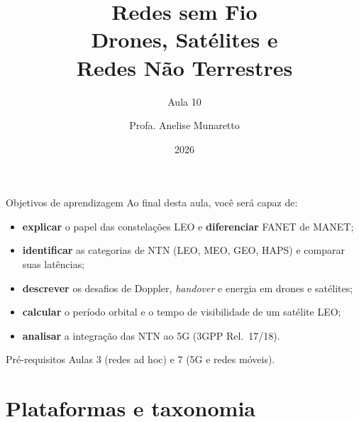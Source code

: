 \documentclass[aspectratio=169,11pt]{beamer}
\title[Redes sem Fio]{Redes sem Fio\\ Drones, Satélites e\\ Redes Não Terrestres}
\subtitle{Aula 10}
\author[Anelise Munaretto]{Profa. Anelise Munaretto}
\institute[Curso]{Redes sem Fio --- Ciência da Computação}
\date{2026}
\begin{document}
\begin{frame}[plain]
  \titlepage
\end{frame}

\begin{frame}{Objetivos de aprendizagem}
  Ao final desta aula, você será capaz de:
  \begin{itemize}
    \item \textbf{explicar} o papel das constelações LEO e \textbf{diferenciar} FANET de MANET;
    \item \textbf{identificar} as categorias de NTN (LEO, MEO, GEO, HAPS) e comparar suas latências;
    \item \textbf{descrever} os desafios de Doppler, \emph{handover} e energia em drones e satélites;
    \item \textbf{calcular} o período orbital e o tempo de visibilidade de um satélite LEO;
    \item \textbf{analisar} a integração das NTN ao 5G (3GPP Rel.~17/18).
  \end{itemize}
  \begin{alertblock}{Pré-requisitos}
    Aulas 3 (redes ad hoc) e 7 (5G e redes móveis).
  \end{alertblock}
\end{frame}

\section{Plataformas e taxonomia}
\end{document}
